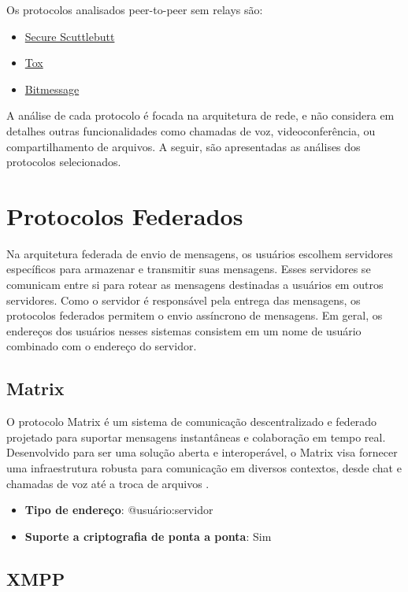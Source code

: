Os protocolos analisados peer-to-peer sem relays são:
\begin{itemize}
  \item \href{https://scuttlebutt.nz/}{Secure Scuttlebutt}
  \item \href{https://tox.chat/}{Tox}
  \item \href{https://bitmessage.org/}{Bitmessage}
\end{itemize}

A análise de cada protocolo é focada na arquitetura de rede, e não considera em detalhes outras funcionalidades como chamadas de voz, videoconferência, ou compartilhamento de arquivos. A seguir, são apresentadas as análises dos protocolos selecionados.

\section{Protocolos Federados}

Na arquitetura federada de envio de mensagens, os usuários escolhem servidores específicos para armazenar e transmitir suas mensagens. Esses servidores se comunicam entre si para rotear as mensagens destinadas a usuários em outros servidores. Como o servidor é responsável pela entrega das mensagens, os protocolos federados permitem o envio assíncrono de mensagens. Em geral, os endereços dos usuários nesses sistemas consistem em um nome de usuário combinado com o endereço do servidor.

\subsection{Matrix}

O protocolo Matrix é um sistema de comunicação descentralizado e federado projetado para suportar mensagens instantâneas e colaboração em tempo real. Desenvolvido para ser uma solução aberta e interoperável, o Matrix visa fornecer uma infraestrutura robusta para comunicação em diversos contextos, desde chat e chamadas de voz até a troca de arquivos \cite{matrixspec}.

\begin{itemize}
  \item \textbf{Tipo de endereço}: @usuário:servidor
  \item \textbf{Suporte a criptografia de ponta a ponta}: Sim
\end{itemize}

\subsection{XMPP}

